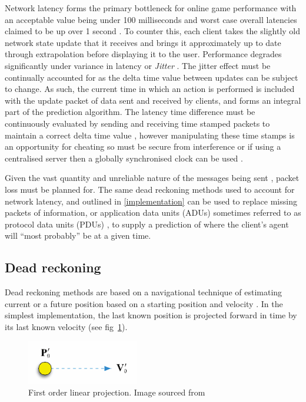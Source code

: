 \documentclass[journal]{IEEEtran}
\begin{document}
Network latency forms the primary bottleneck for online game performance with an acceptable value being under 100 milliseconds \cite{lee2015outatime} \cite{smed2002aspects} and worst case overall latencies claimed to be up over 1 second \cite{claypool2006latency}. To counter this, each client takes the slightly old network state update that it receives and brings it approximately up to date through extrapolation before displaying it to the user. Performance degrades significantly under variance in latency or \textit{Jitter} \cite{beigbeder2004effects} \cite{dick2005analysis}. The jitter effect must be continually accounted for as the delta time value between updates can be subject to change. As such, the current time in which an action is performed is included with the update packet of data sent and received by clients, and forms an integral part of the prediction algorithm. The latency time difference must be continuously evaluated by sending and receiving time stamped packets to maintain a correct delta time value \cite{glazer2015multiplayer}, however manipulating these time stamps is an opportunity for cheating \cite{jamin2003cheat} so must be secure from interference or if using a centralised server then a globally synchronised clock can be used \cite{aggarwal2004accuracy}.

Given the vast quantity and unreliable nature of the messages being sent \cite{cronin2001distributed}, packet loss must be planned for. The same dead reckoning methods used to account for network latency, and outlined in \ref{implementation} can be used to replace missing packets of information, or application data units (ADUs) \cite{diot1999distributed} sometimes referred to as protocol data units (PDUs) \cite{dis1998ieee}, to supply a prediction of where the client's agent will ``most probably'' be at a given time.

\subsection{Dead reckoning} \label{deadReckoning}

Dead reckoning methods are based on a navigational technique of estimating current or a future position based on a starting position and velocity \cite{smed2002aspects}. In the simplest implementation, the last known position is projected forward in time by its last known velocity \cite{murphy2011believable} (see fig~\ref{fig:dr1}).

\begin{figure}[h]
    \centering
    \includegraphics[width=0.35\linewidth]{DR1.png}
    \caption{First order linear projection. Image sourced from \cite{murphy2011believable}}
    \label{fig:dr1}
\end{figure}
\end{document}
